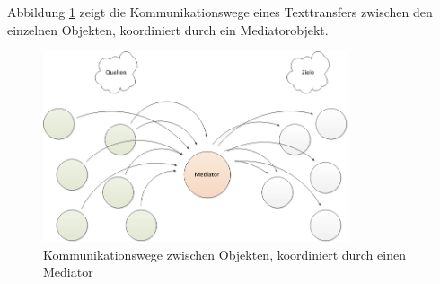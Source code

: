 Abbildung \ref{strukturiert} zeigt die Kommunikationswege eines Texttransfers zwischen den einzelnen Objekten, koordiniert durch ein Mediatorobjekt. 
\begin{figure}[htp!]
	\includegraphics[width=0.8\textwidth]{mediated}
	\caption{Kommunikationswege zwischen Objekten, koordiniert durch einen Mediator}
	\label{strukturiert}
\end{figure}
